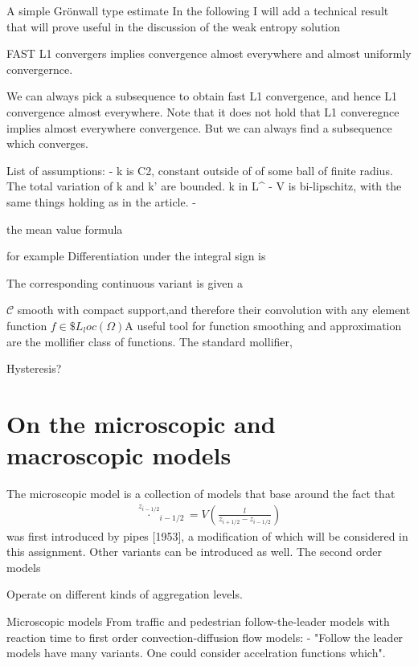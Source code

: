 \begin{}
\begin{lemma}{A simple Grönwall type estimate}
In the following I will add a technical result that will prove useful in the discussion of the weak entropy solution

FAST L1 convergers implies convergence almost everywhere and almost uniformly convergernce. 

\begin{}

We can always pick a subsequence to obtain fast L1 convergence, and hence L1 convergence almost everywhere. 
Note that it does not hold that L1 converegnce implies almost everywhere convergence. But we can always find a subsequence which converges. 

List of assumptions: 
- k is C2, constant outside of of some ball of finite radius. The total variation of k and k' are bounded. k in L^\infty 
- V is bi-lipschitz, with the same things holding as in the article. 
- 


the mean value formula 

for example
Differentiation under the integral sign is 

The corresponding continuous variant is given a





$\mathscr{C}$
smooth with compact support,and therefore their convolution with any element function $f \in \$L_loc(\Omega)$A useful tool for function smoothing and approximation are the mollifier class of functions. The standard mollifier, 


Hysteresis?

\section{On the microscopic and macroscopic models}



The microscopic model is a collection of models that base around the fact that
\begin{align}
    \overset{z_{i-1/2}}{\cdot}_{i-1/2} = V\left(\frac{l}{z_{i+1/2} - z_{i-1/2}}\right)
\end{align}
was first introduced by pipes [1953], a modification of which will be considered in this assignment. Other variants can be introduced as well. The second order models 

Operate on different kinds of aggregation levels. 

Microscopic models 
From traffic and pedestrian follow-the-leader models with reaction time to first order convection-diffusion flow models:  - "Follow the leader models have many variants. One could consider accelration functions which". 


\end{}
\end{lemma}
\end{}
